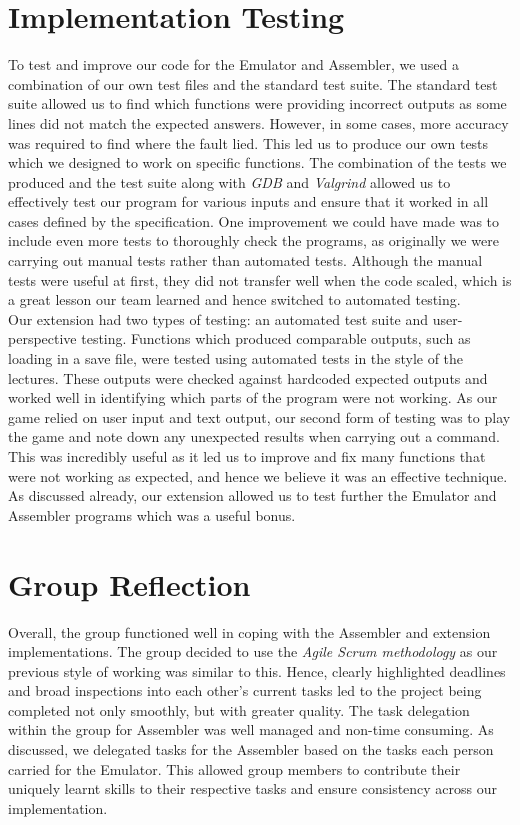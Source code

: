 \documentclass[10pt]{article}
\begin{document}
\section*{Implementation Testing}

To test and improve our code for the Emulator and Assembler, we used a combination of our own test files and the standard test suite. The standard test suite allowed us to find which functions were providing incorrect outputs as some lines did not match the expected answers. However, in some cases, more accuracy was required to find where the fault lied. This led us to produce our own tests which we designed to work on specific functions. The combination of the tests we produced and the test suite along with {\sl GDB} and {\sl Valgrind} allowed us to effectively test our program for various inputs and ensure that it worked in all cases defined by the specification. One improvement we could have made was to include even more tests to thoroughly check the programs, as originally we were carrying out manual tests rather than automated tests. Although the manual tests were useful at first, they did not transfer well when the code scaled, which is a great lesson our team learned and hence switched to automated testing. 
\\

Our extension had two types of testing: an automated test suite and user-perspective testing. Functions which produced comparable outputs, such as loading in a save file, were tested using automated tests in the style of the lectures. These outputs were checked against hardcoded expected outputs and worked well in identifying which parts of the program were not working. As our game relied on user input and text output, our second form of testing was to play the game and note down any unexpected results when carrying out a command. This was incredibly useful as it led us to improve and fix many functions that were not working as expected, and hence we believe it was an effective technique. As discussed already, our extension allowed us to test further the Emulator and Assembler programs which was a useful bonus.

\section*{Group Reflection}

Overall, the group functioned well in coping with the Assembler and extension implementations. The group decided to use the {\sl Agile Scrum methodology} as our previous style of working was similar to this. Hence, clearly highlighted deadlines and broad inspections into each other’s current tasks led to the project being completed not only smoothly, but with greater quality. The task delegation within the group for Assembler was well managed and non-time consuming. As discussed, we delegated tasks for the Assembler based on the tasks each person carried for the Emulator. This allowed group members to contribute their uniquely learnt skills to their respective tasks and ensure consistency across our implementation. 
\\
\end{document}
